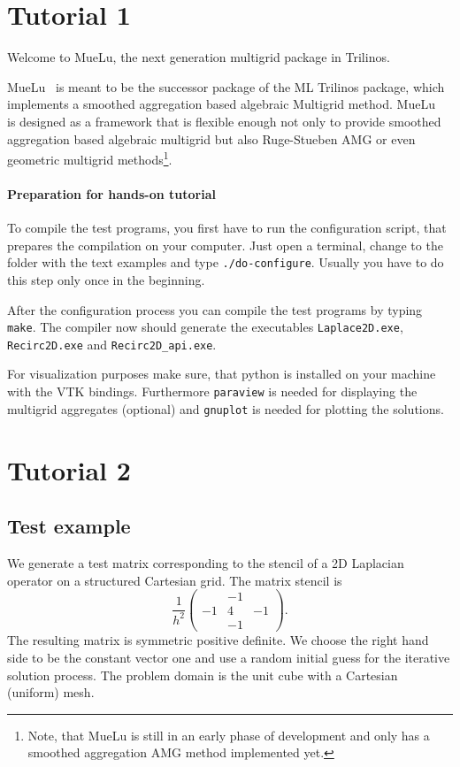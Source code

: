 \documentclass[12pt,a4paper]{article}
\author{Tobias Wiesner}
\newcommand{\MueLu}{MueLu}
\begin{document}
\section{Tutorial 1}
Welcome to \MueLu, the next generation multigrid package in Trilinos.

\MueLu~ is meant to be the successor package of the ML Trilinos package, which implements a smoothed aggregation based algebraic Multigrid method. \MueLu~ is designed as a framework that is flexible enough not only to provide smoothed aggregation based algebraic multigrid but also Ruge-Stueben AMG or even geometric multigrid methods\footnote{Note, that MueLu is still in an early phase of development and only has a smoothed aggregation AMG method implemented yet.}.


\paragraph{Preparation for hands-on tutorial}
To compile the test programs, you first have to run the configuration script, that prepares the compilation on your computer. Just open a terminal, change to the folder with the text examples and type \verb|./do-configure|. Usually you have to do this step only once in the beginning.

After the configuration process you can compile the test programs by typing \verb|make|. The compiler now should generate the executables \verb|Laplace2D.exe|, \verb|Recirc2D.exe| and \verb|Recirc2D_api.exe|. 

For visualization purposes make sure, that python is installed on your machine with the VTK bindings. Furthermore \verb|paraview| is needed for displaying the multigrid aggregates (optional) and \verb|gnuplot| is needed for plotting the solutions.

\section{Tutorial 2}

\subsection{Test example}
We generate a test matrix corresponding to the stencil of a 2D Laplacian operator on a structured Cartesian grid. The matrix stencil is
\begin{displaymath}
\frac{1}{h^2}\begin{pmatrix} & -1 & \\ -1 & 4 & -1 \\ & -1 & \end{pmatrix}.
\end{displaymath}
The resulting matrix is symmetric positive definite. We choose the right hand side to be the constant vector one and use a random initial guess for the iterative solution process. The problem domain is the unit cube with a Cartesian (uniform) mesh.
\end{document}

